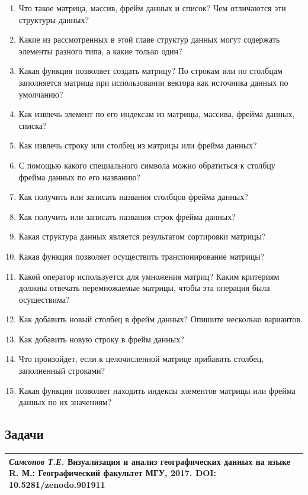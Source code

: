 \documentclass[]{book}
\providecommand{\tightlist}{%
  \setlength{\itemsep}{0pt}\setlength{\parskip}{0pt}}
\begin{document}
\begin{enumerate}
\def\labelenumi{\arabic{enumi}.}
\tightlist
\item
  Что такое матрица, массив, фрейм данных и список? Чем отличаются эти
  структуры данных?
\item
  Какие из рассмотренных в этой главе структур данных могут содержать
  элементы разного типа, а какие только один?
\item
  Какая функция позволяет создать матрицу? По строкам или по столбцам
  заполняется матрица при использовании вектора как источника данных по
  умолчанию?
\item
  Как извлечь элемент по его индексам из матрицы, массива, фрейма
  данных, списка?
\item
  Как извлечь строку или столбец из матрицы или фрейма данных?
\item
  С помощью какого специального символа можно обратиться к столбцу
  фрейма данных по его названию?
\item
  Как получить или записать названия столбцов фрейма данных?
\item
  Как получить или записать названия строк фрейма данных?
\item
  Какая структура данных является результатом сортировки матрицы?
\item
  Какая функция позволяет осуществить транспонирование матрицы?
\item
  Какой оператор используется для умножения матриц? Каким критериям
  должны отвечать перемножаемые матрицы, чтобы эта операция была
  осуществима?
\item
  Как добавить новый столбец в фрейм данных? Опишите несколько
  вариантов.
\item
  Как добавить новую строку в фрейм данных?
\item
  Что произойдет, если к целочисленной матрице прибавить столбец,
  заполненный строками?
\item
  Какая функция позволяет находить индексы элементов матрицы или фрейма
  данных по их значениям?
\end{enumerate}

\subsection{Задачи}\label{tasks_matrix}

\begin{longtable}[]{@{}l@{}}
\toprule
\emph{Самсонов Т.Е.} \textbf{Визуализация и анализ географических данных
на языке R.} М.: Географический факультет МГУ, 2017. DOI:
10.5281/zenodo.901911\tabularnewline
\bottomrule
\end{longtable}
\end{document}
